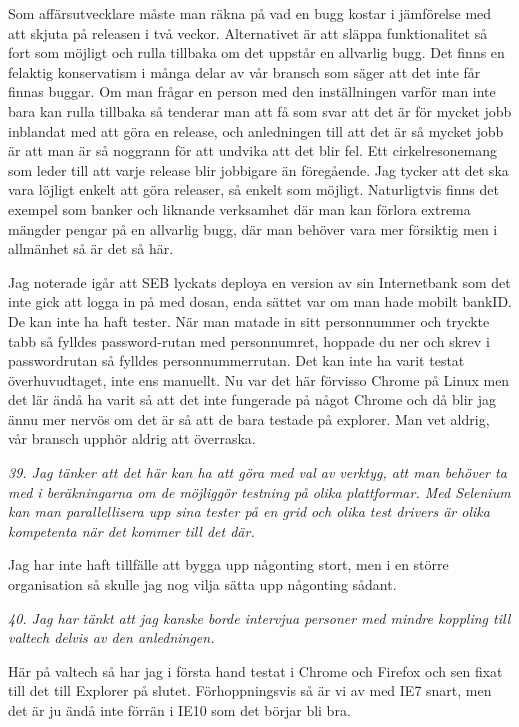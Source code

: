 \documentclass[11pt]{article}
\begin{document}
Som affärsutvecklare måste man räkna på vad en bugg kostar i jämförelse med att skjuta på releasen i två veckor. Alternativet är att släppa funktionalitet så fort som möjligt och rulla tillbaka om det uppstår en allvarlig bugg. Det finns en felaktig konservatism i många delar av vår bransch som säger att det inte får finnas buggar. Om man frågar en person med den inställningen varför man inte bara kan rulla tillbaka så tenderar man att få som svar att det är för mycket jobb inblandat med att göra en release, och anledningen till att det är så mycket jobb är att man är så noggrann för att undvika att det blir fel. Ett cirkelresonemang som leder till att varje release blir jobbigare än föregående. Jag tycker att det ska vara löjligt enkelt att göra releaser, så enkelt som möjligt. Naturligtvis finns det exempel som banker och liknande verksamhet där man kan förlora extrema mängder pengar på en allvarlig bugg, där man behöver vara mer försiktig men i allmänhet så är det så här.

Jag noterade igår att SEB lyckats deploya en version av sin Internetbank som det inte gick att logga in på med dosan, enda sättet var om man hade mobilt bankID. De kan inte ha haft tester. När man matade in sitt personnummer och tryckte tabb så fylldes password-rutan med personnumret, hoppade du ner och skrev i passwordrutan så fylldes personnummerrutan. Det kan inte ha varit testat överhuvudtaget, inte ens manuellt. Nu var det här förvisso Chrome på Linux men det lär ändå ha varit så att det inte fungerade på något Chrome och då blir jag ännu mer nervös om det är så att de bara testade på explorer. Man vet aldrig, vår bransch upphör aldrig att överraska.

\emph{39. Jag tänker att det här kan ha att göra med val av verktyg, att man behöver ta med i beräkningarna om de möjliggör testning på olika plattformar. Med Selenium kan man parallellisera upp sina tester på en grid och olika test drivers är olika kompetenta när det kommer till det där.}

Jag har inte haft tillfälle att bygga upp någonting stort, men i en större organisation så skulle jag nog vilja sätta upp någonting sådant.

\emph{40. Jag har tänkt att jag kanske borde intervjua personer med mindre koppling till valtech delvis av den anledningen.}

Här på valtech så har jag i första hand testat i Chrome och Firefox och sen fixat till det till Explorer på slutet. Förhoppningsvis så är vi av med IE7 snart, men det är ju ändå inte förrän i IE10 som det börjar bli bra.
\end{document}
